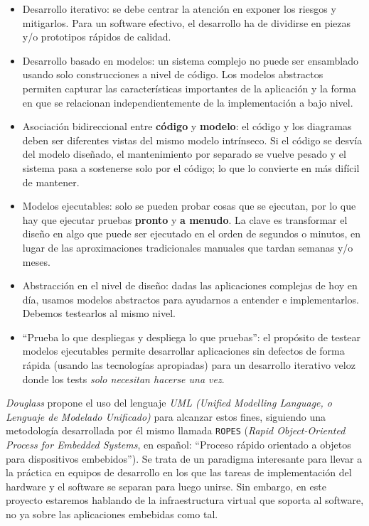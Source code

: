 \begin{itemize}
	\item Desarrollo iterativo: se debe centrar la atención en exponer los riesgos y mitigarlos. Para un software efectivo, el desarrollo ha de dividirse en piezas y/o prototipos rápidos de calidad.
	\item Desarrollo basado en modelos: un sistema complejo no puede ser ensamblado usando solo construcciones a nivel de código. Los modelos abstractos permiten capturar las características importantes de la aplicación y la forma en que se relacionan independientemente de la implementación a bajo nivel.
	\item Asociación bidireccional entre \textbf{código} y \textbf{modelo}: el código y los diagramas deben ser diferentes vistas del mismo modelo intrínseco. Si el código se desvía del modelo diseñado, el mantenimiento por separado se vuelve pesado y el sistema pasa a sostenerse solo por el código; lo que lo convierte en más difícil de mantener.
	\item Modelos ejecutables: solo se pueden probar cosas que se ejecutan, por lo que hay que ejecutar pruebas \textbf{pronto} y \textbf{a menudo}. La clave es transformar el diseño en algo que puede ser ejecutado en el orden de segundos o minutos, en lugar de las aproximaciones tradicionales manuales que tardan semanas y/o meses.
	\item Abstracción en el nivel de diseño: dadas las aplicaciones complejas de hoy en día, usamos modelos abstractos para ayudarnos a entender e implementarlos. Debemos testearlos al mismo nivel.
	\item ``Prueba lo que despliegas y despliega lo que pruebas'': el propósito de testear modelos ejecutables permite desarrollar aplicaciones sin defectos de forma rápida (usando las tecnologías apropiadas) para un desarrollo iterativo veloz donde los tests \textit{solo necesitan hacerse una vez}.
\end{itemize}

\textit{Douglass} propone el uso del lenguaje \textit{UML (Unified Modelling Language, o Lenguaje de Modelado Unificado)} para alcanzar estos fines, siguiendo una metodología desarrollada por él mismo llamada \texttt{ROPES} (\textit{Rapid Object-Oriented Process for Embedded Systems}, en español: ``Proceso rápido orientado a objetos para dispositivos embebidos''). Se trata de un paradigma interesante para llevar a la práctica en equipos de desarrollo en los que las tareas de implementación del hardware y el software se separan para luego unirse. Sin embargo, en este proyecto estaremos hablando de la infraestructura virtual que soporta al software, no ya sobre las aplicaciones embebidas como tal.

